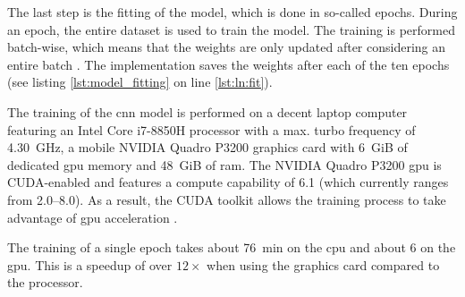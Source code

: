 The last step is the fitting of the model, which is done in so-called epochs.
During an epoch, the entire dataset is used to train the model.
The training is performed batch-wise, which means that the weights are only updated after considering an entire batch \cite{training_arch_tf_keras_sequential}.
The implementation saves the weights after each of the ten epochs (see listing \ref{lst:model_fitting} on line \ref{lst:ln:fit}).

The training of the \acrshort{cnn} model is performed on a decent laptop computer featuring an Intel Core i7-8850H processor with a max. turbo frequency of \SI{4.30}{GHz}, a mobile NVIDIA Quadro P3200 graphics card with \SI{6}{GiB} of dedicated \acrshort{gpu} memory and \SI{48}{GiB} of \acrshort{ram}.
The NVIDIA Quadro P3200 \acrshort{gpu} is CUDA-enabled and features a compute capability of \num{6.1} (which currently ranges from \numrange{2.0}{8.0}).
As a result, the CUDA toolkit allows the training process to take advantage of \acrshort{gpu} acceleration \cite{training_train_nvidia}.

The training of a single epoch takes about \SI{76}{min} on the \acrshort{cpu} and about \SI{6}{\min} on the \acrshort{gpu}.
This is a speedup of over $12\times$ when using the graphics card compared to the processor.

